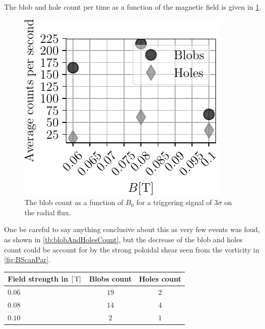 The blob and hole count per time as a function of the magnetic field is given in \cref{fig:BScanBlobCount}.
%
\begin{figure}[htb]
    \centering
    \includegraphics{fig/results/bScan/BScanBlobCount}
    \caption{The blob count as a function of $B_0$ for a triggering signal of $3\sigma$ on the radial flux.}
    \label{fig:BScanBlobCount}
\end{figure}
%
One be careful to say anything conclusive about this as very few events was foud, as shown in \cref{tb:blobAndHolesCount}, but the decrease of the blob and holes count could be account for by the strong poloidal shear seen from the vorticity in \cref{fig:BScanPar}.
%
\begin{center}
        \begin{tabular}{l|cc}
            \hline
            Field strength in $[\, \text{T}]$ & Blobs count & Holes count\\
            \hline
            $0.06$ & $19$ & $2$ \\
            $0.08$ & $14$ & $4$ \\
            $0.10$ & $ 2$ & $1$ \\
            \hline\hline
        \end{tabular}
        \label{tb:blobAndHolesCount}
\end{center}
%

